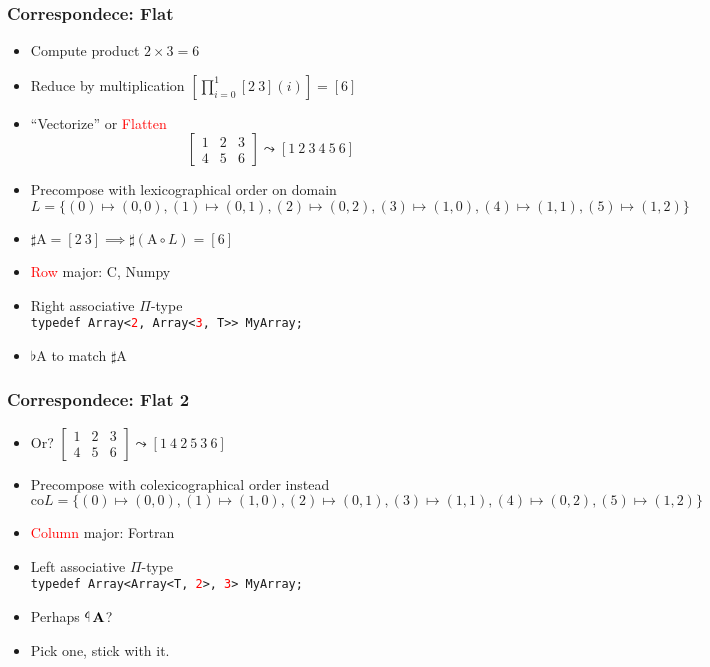 \documentclass[xetex,mathserif,serif]{beamer}
\newcommand\mrm[1]{\mathrm{#1}}
\newcommand\brm[1]{\bm{\mrm{#1}}}
\newcommand\tlaf{\mathop{\rotatebox[origin=c]{180}{$\flat$}}}
\newcommand\NB[1]{\textcolor{red}{#1}}
\begin{document}
\begin{frame}
  \frametitle{Correspondece: Flat}
  \pause
  \begin{itemize}[<+->]
    \item Compute product \(2 \times 3 = 6\)
    \item Reduce by multiplication \(\left[\prod_{i=0}^1 [2\ 3](i)\right] = [ 6 ]\)
    \item ``Vectorize'' or \NB{Flatten} \[
      \begin{bmatrix}
        1 & 2 & 3 \\
        4 & 5 & 6
      \end{bmatrix} \leadsto [1\ 2\ 3\ 4\ 5\ 6]
      \]
    \item Precompose with lexicographical order on domain $
      L = \{(0) \mapsto (0,0), (1)\mapsto (0,1), (2)\mapsto(0,2), (3)\mapsto(1,0), (4)\mapsto(1,1), (5)\mapsto(1,2)\}
      $
    \item \(\sharp \brm A = [2\ 3] \implies \sharp (\brm A \circ L) = [6] \)
    \item \NB{Row} major: C, Numpy
    \item Right associative \(\Pi\)-type\\
      \texttt{typedef Array<\NB 2, Array<\NB 3, T>> MyArray;}
    \item \(\flat \brm A\) to match \(\sharp \brm A\)
  \end{itemize}
\end{frame}

\begin{frame}
  \frametitle{Correspondece: Flat 2}
  \pause
  \begin{itemize}[<+->]
    \item Or? $
      \begin{bmatrix}
        1 & 2 & 3 \\
        4 & 5 & 6
      \end{bmatrix} \leadsto [1\ 4\ 2\ 5\ 3\ 6]
      $ 
    \item Precompose with colexicographical order instead
      \(\mrm{co}L = \{ (0)\mapsto(0,0), (1)\mapsto(1,0), (2)\mapsto(0,1), (3)\mapsto(1,1), (4)\mapsto(0,2), (5)\mapsto(1,2) \}\)
    \item \NB{Column} major: Fortran
    \item Left associative \(\Pi\)-type \\
      \texttt{typedef Array<Array<T, \NB 2>, \NB 3> MyArray;}
    \item Perhaps \(\tlaf \brm A\)?
    \item Pick one, stick with it.
  \end{itemize}
\end{frame}
\end{document}
